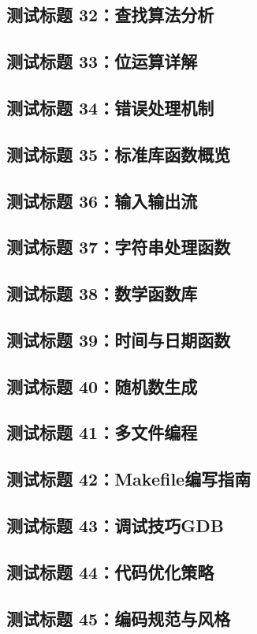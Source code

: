 \subsection{测试标题 32：查找算法分析}
\subsection{测试标题 33：位运算详解}
\subsection{测试标题 34：错误处理机制}
\subsection{测试标题 35：标准库函数概览}
\subsection{测试标题 36：输入输出流}
\subsection{测试标题 37：字符串处理函数}
\subsection{测试标题 38：数学函数库}
\subsection{测试标题 39：时间与日期函数}
\subsection{测试标题 40：随机数生成}
\subsection{测试标题 41：多文件编程}
\subsection{测试标题 42：Makefile编写指南}
\subsection{测试标题 43：调试技巧GDB}
\subsection{测试标题 44：代码优化策略}
\subsection{测试标题 45：编码规范与风格}
